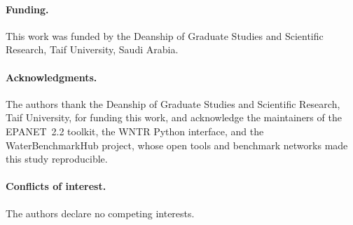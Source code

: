 \documentclass[11pt,a4paper]{article}
\begin{document}
\paragraph{Funding.}
This work was funded by the Deanship of Graduate Studies and Scientific Research,
Taif University, Saudi Arabia.

\paragraph{Acknowledgments.}
The authors thank the Deanship of Graduate Studies and Scientific Research, Taif
University, for funding this work, and acknowledge the maintainers of the
EPANET~2.2 toolkit, the WNTR Python interface, and the WaterBenchmarkHub project,
whose open tools and benchmark networks made this study reproducible.

\paragraph{Conflicts of interest.}
The authors declare no competing interests.


\end{document}
